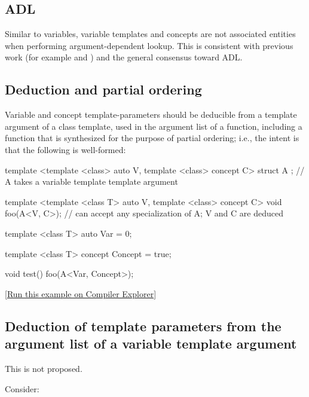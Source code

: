 \documentclass{wg21}
\begin{document}
\subsection{ADL}

Similar to variables, variable templates and concepts are not associated entities when performing argument-dependent lookup.
This is consistent with previous work (for example  and ) and the general consensus toward ADL.

\subsection{Deduction and partial ordering}

Variable and concept template-parameters should be deducible from a template argument of a class template, used in the argument list of a function,
including a function that is synthesized for the purpose of partial ordering; i.e., the intent is that the following is well-formed:

\begin{colorblock}
template <template <class> auto V, template <class> concept C>
struct A {}; // A takes a variable template template argument

template <template <class T> auto V, template <class> concept C>
void foo(A<V, C>);  // can accept any specialization of A; V and C are deduced

template <class T>
auto Var = 0;

template <class T>
concept Concept = true;

void test() {
    foo(A<Var, Concept>{});
}
\end{colorblock}

[\href{https://compiler-explorer.com/z/66dr6fnKj}{Run this example on Compiler Explorer}]

\subsection{Deduction of template parameters from the argument list of a variable template argument}

This is not proposed.

Consider:

\end{document}
